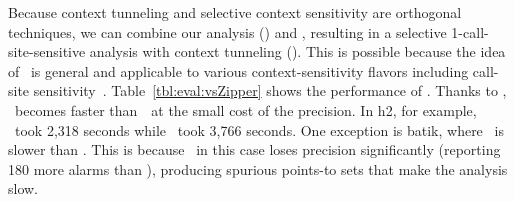 %
%

Because context tunneling and selective context sensitivity are orthogonal techniques, we can combine 
our analysis (\ours) and \Zipper, resulting in a selective 1-call-site-sensitive analysis with context tunneling (\oursZipper). 
This is possible because the idea of \Zipper~is general and applicable to various context-sensitivity flavors including call-site sensitivity~\cite{ZipperJournal20}. 
Table~\ref{tbl:eval:vsZipper} shows the performance of \oursZipper. Thanks to \Zipper, \oursZipper~becomes faster than~\ours~at the small cost of the precision.
In h2, for example, \oursZipper~took 2,318 seconds while \ours~took 3,766 seconds.
One exception is batik, where \oursZipper~is slower than \ours. This is because 
\oursZipper~in this case loses precision significantly (reporting 180 more alarms than \ours), producing spurious points-to sets that make the analysis slow. 

